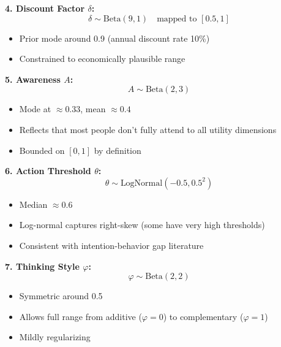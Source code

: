 \begin{tcolorbox}[colback=gray!5!white, colframe=gray!75!black,
    title=Prior Specification: Core Parameters]
\textbf{4. Discount Factor $\delta$:}
\begin{equation}
\delta \sim \text{Beta}(9, 1) \quad \text{mapped to } [0.5, 1]
\end{equation}
\begin{itemize}[nosep]
\item Prior mode around 0.9 (annual discount rate 10\%)
\item Constrained to economically plausible range
\end{itemize}
\end{tcolorbox}

\begin{tcolorbox}[colback=gray!5!white, colframe=gray!75!black,
    title=Prior Specification: AWX-WAX Parameters]
\textbf{5. Awareness $A$:}
\begin{equation}
A \sim \text{Beta}(2, 3)
\end{equation}
\begin{itemize}[nosep]
\item Mode at $\approx 0.33$, mean $\approx 0.4$
\item Reflects that most people don't fully attend to all utility dimensions
\item Bounded on $[0, 1]$ by definition
\end{itemize}

\textbf{6. Action Threshold $\theta$:}
\begin{equation}
\theta \sim \text{LogNormal}(-0.5, 0.5^2)
\end{equation}
\begin{itemize}[nosep]
\item Median $\approx 0.6$
\item Log-normal captures right-skew (some have very high thresholds)
\item Consistent with intention-behavior gap literature
\end{itemize}

\textbf{7. Thinking Style $\varphi$:}
\begin{equation}
\varphi \sim \text{Beta}(2, 2)
\end{equation}
\begin{itemize}[nosep]
\item Symmetric around 0.5
\item Allows full range from additive ($\varphi=0$) to complementary ($\varphi=1$)
\item Mildly regularizing
\end{itemize}
\end{tcolorbox}

